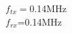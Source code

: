 \documentclass[preview]{standalone}
\begin{document}
\begin{center}
$f_{tx}=$0.14MHz\\$f_{rx}$=0.14MHz
\end{center}
\end{document}
